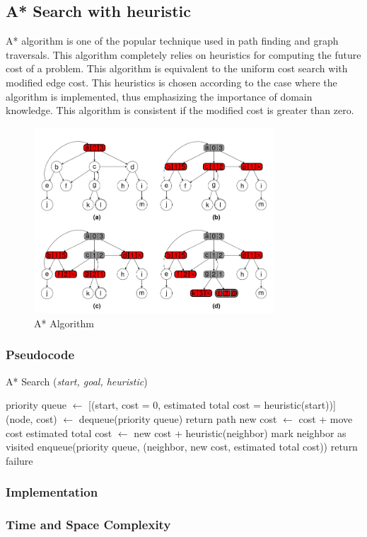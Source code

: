 \subsection{A* Search with heuristic}
\noindent A* algorithm is one of the popular technique used in path finding and graph traversals. This algorithm completely relies on heuristics for computing the future cost of a problem. This algorithm is equivalent to the uniform cost search with modified edge cost. This heuristics is chosen according to the case where the algorithm is implemented, thus emphasizing the importance of domain knowledge. This algorithm is consistent if the modified cost is greater than zero.

\begin{figure}[H]
	\centering
	\includegraphics[width=0.8\textwidth]{./imgs/astar.png}
	\caption{A* Algorithm}
\end{figure}

\subsubsection{Pseudocode}
\begin{algorithm}[H]
	\caption{A* Search (\textit{start, goal, heuristic})}
	\label{alg:astar}
	\begin{algorithmic}[1]
	\State priority queue \(\gets\) [(start, cost = 0, estimated total cost = heuristic(start))]
		\State (node, cost) \(\gets\) dequeue(priority queue)
			\State return path
		\EndIf
			\State new cost \(\gets\) cost + move cost
			\State estimated total cost \(\gets\) new cost + heuristic(neighbor)
				\State mark neighbor as visited
				\State enqueue(priority queue, (neighbor, new cost, estimated total cost))
			\EndIf
		\EndFor
	\EndWhile
	\State return failure
	\end{algorithmic}
\end{algorithm}

\subsubsection{Implementation}

\subsubsection{Time and Space Complexity}